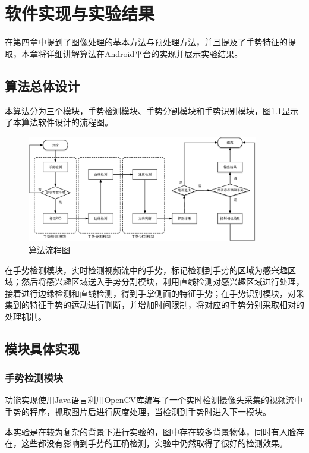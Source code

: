 \documentclass{XDBAthesis}
\begin{document}
\else
\fi
\chapter{软件实现与实验结果}
在第四章中提到了图像处理的基本方法与预处理方法，并且提及了手势特征的提取，本章将详细讲解算法在Android平台的实现并展示实验结果。

\section{算法总体设计}

本算法分为三个模块，手势检测模块、手势分割模块和手势识别模块，图\ref{fg:chart}显示了本算法软件设计的流程图。
\begin{figure}
    \centering
    \includegraphics[width=0.9\textwidth ]{figure/chart}
    \caption{算法流程图}
    \label{fg:chart}
\end{figure}

在手势检测模块，实时检测视频流中的手势，标记检测到手势的区域为感兴趣区域；然后将感兴趣区域送入手势分割模块，利用直线检测对感兴趣区域进行处理，接着进行边缘检测和直线检测，得到手掌侧面的特征手势；在手势识别模块，对采集到的特征手势的运动进行判断，并增加时间限制，将对应的手势分别采取相对的处理机制。

\section{模块具体实现}

\subsection{手势检测模块}

功能实现使用Java语言利用OpenCV库编写了一个实时检测摄像头采集的视频流中手势的程序，抓取图片后进行灰度处理，当检测到手势时进入下一模块。

本实验是在较为复杂的背景下进行实验的，图中存在较多背景物体，同时有人脸存在，这些都没有影响到手势的正确检测，实验中仍然取得了很好的检测效果。
\end{document}
